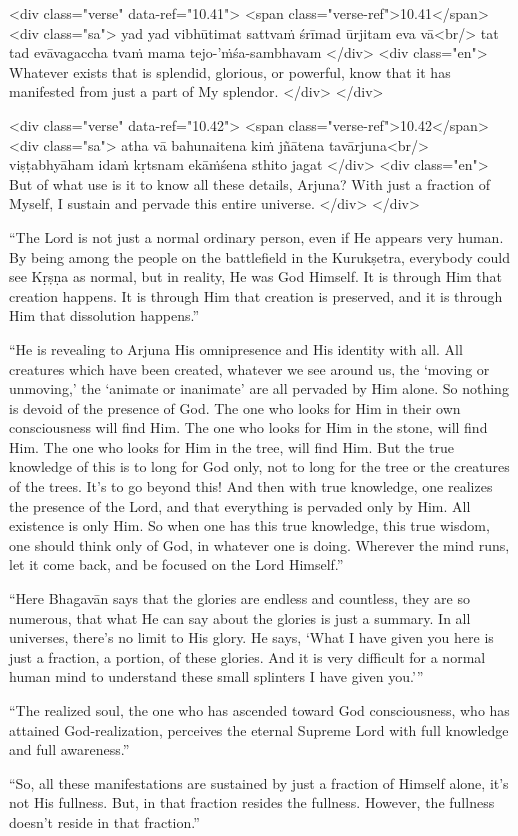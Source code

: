 \begin{html}
<div class="verse" data-ref="10.41">
  <span class="verse-ref">10.41</span>
  <div class="sa">
    yad yad vibhūtimat sattvaṁ śrīmad ūrjitam eva vā<br/>
    tat tad evāvagaccha tvaṁ mama tejo-’ṁśa-sambhavam
  </div>
  <div class="en">
    Whatever exists that is splendid, glorious, or powerful, know that it has manifested from just a part of My splendor.
  </div>
</div>
\end{html}



\begin{html}
<div class="verse" data-ref="10.42">
  <span class="verse-ref">10.42</span>
  <div class="sa">
    atha vā bahunaitena kiṁ jñātena tavārjuna<br/>
    viṣṭabhyāham idaṁ kṛtsnam ekāṁśena sthito jagat
  </div>
  <div class="en">
    But of what use is it to know all these details, Arjuna? With just a fraction of Myself, I sustain and pervade this entire universe.
  </div>
</div>
\end{html}


\enquote{The Lord is not just a normal ordinary person, even if He appears very human. By being among the people on the battlefield in the Kurukṣetra, everybody could see Kṛṣṇa as normal, but in reality, He was God Himself. It is through Him that creation happens. It is through Him that creation is preserved, and it is through Him that dissolution happens.}

\enquote{He is revealing to Arjuna His omnipresence and His identity with all. All creatures which have been created, whatever we see around us, the \enquote{moving or unmoving,} the \enquote{animate or inanimate} are all pervaded by Him alone. So nothing is devoid of the presence of God. The one who looks for Him in their own consciousness will find Him. The one who looks for Him in the stone, will find Him. The one who looks for Him in the tree, will find Him. But the true knowledge of this is to long for God only, not to long for the tree or the creatures of the trees. It’s to go beyond this! And then with true knowledge, one realizes the presence of the Lord, and that everything is pervaded only by Him. All existence is only Him. So when one has this true knowledge, this true wisdom, one should think only of God, in whatever one is doing. Wherever the mind runs, let it come back, and be focused on the Lord Himself.}

\enquote{Here Bhagavān says that the glories are endless and countless, they are so numerous, that what He can say about the glories is just a summary. In all universes, there’s no limit to His glory. He says, \enquote{What I have given you here is just a fraction, a portion, of these glories. And it is very difficult for a normal human mind to understand these small splinters I have given you.}}

\enquote{The realized soul, the one who has ascended toward God consciousness, who has attained God-realization, perceives the eternal Supreme Lord with full knowledge and full awareness.}

\enquote{So, all these manifestations are sustained by just a fraction of Himself alone, it’s not His fullness. But, in that fraction resides the fullness. However, the fullness doesn’t reside in that fraction.}
